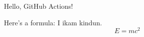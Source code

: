 \documentclass{article}
\begin{document}
Hello, GitHub Actions!

Here's a formula:
I ikam kindun.
\[
E = mc^2
\]
\end{document}
